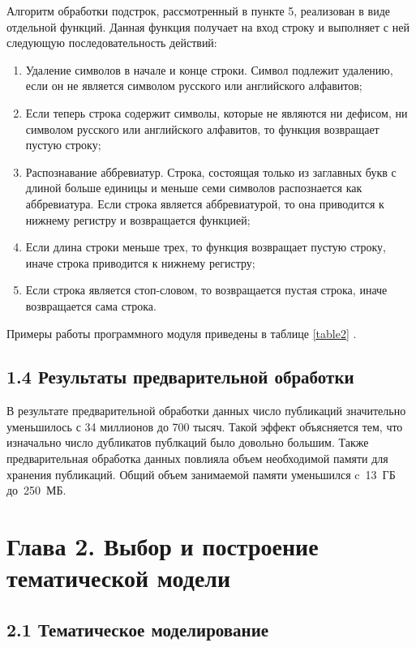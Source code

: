 \documentclass[a4paper]{report}
\begin{document}
	
	Алгоритм обработки подстрок, рассмотренный в пункте 5, реализован в виде отдельной функций.  Данная функция получает на вход строку и выполняет с ней следующую последовательность действий:
	\begin{enumerate}
	\item{ Удаление символов в начале и конце строки. Символ подлежит удалению, если он не является символом русского или английского алфавитов;}
	
	\item{ Если теперь строка содержит символы, которые не являются ни дефисом, ни символом русского или английского алфавитов, то функция возвращает пустую строку; }
	
	\item{ Распознавание аббревиатур. Строка, состоящая только из заглавных букв с длиной больше единицы и меньше семи символов распознается как аббревиатура. Если строка является аббревиатурой, то она приводится к нижнему регистру и возвращается функцией;}
	
	\item{ Если длина строки меньше трех, то функция возвращает пустую строку, иначе строка приводится к нижнему регистру; }
	
	\item{ Если строка является стоп-словом, то возвращается пустая строка, иначе возвращается сама строка.}
	\end{enumerate}
	
	Примеры работы программного модуля приведены в таблице \ref{table2} .
	

	\subsection{1.4 Результаты предварительной обработки} 
	
	В результате предварительной обработки данных число публикаций значительно уменьшилось с 34 миллионов до 700 тысяч. Такой эффект объясняется тем, что изначально число дубликатов публкаций было довольно большим. Также предварительная обработка данных повлияла объем необходимой памяти для хранения публикаций. Общий объем занимаемой памяти уменьшился c~13~ГБ до~250~МБ.
	
	\newpage
	\section{Глава 2. Выбор и построение тематической модели}
	\subsection{2.1 Тематическое моделирование}
\end{document}
